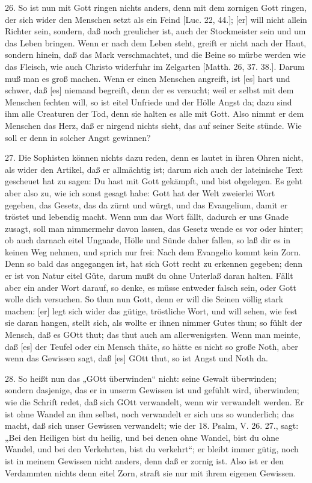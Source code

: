 26. So ist nun mit Gott ringen nichts anders, denn mit dem zornigen Gott ringen, der sich wider den Menschen setzt als ein Feind [Luc. 22, 44.]; [er] will nicht allein Richter sein, sondern, daß noch greulicher ist, auch der Stockmeister sein und um das Leben bringen. Wenn er nach dem Leben steht, greift er nicht nach der Haut, sondern hinein, daß das Mark verschmachtet, und die Beine so mürbe werden wie das Fleisch, wie auch Christo widerfuhr im Zelgarten [Matth. 26, 37. 38.]. Darum muß man es groß machen. Wenn er einen Menschen angreift, ist [es] hart und schwer, daß [es] niemand begreift, denn der es versucht; weil er selbst mit dem Menschen fechten will, so ist eitel Unfriede und der Hölle Angst da; dazu sind ihm alle Creaturen der Tod, denn sie halten es alle mit Gott. Also nimmt er dem Menschen das Herz, daß er nirgend nichts sieht, das auf seiner Seite stünde. Wie soll er denn in solcher Angst gewinnen?

27. Die Sophisten können nichts dazu reden, denn es lautet in ihren Ohren nicht, als wider den Artikel, daß er allmächtig ist; darum sich auch der lateinische Text gescheuet hat zu sagen: Du hast mit Gott gekämpft, und bist obgelegen. Es geht aber also zu, wie ich sonst gesagt habe: Gott hat der Welt zweierlei Wort gegeben, das Gesetz, das da zürnt und würgt, und das Evangelium, damit er tröstet und lebendig macht. Wenn nun das Wort fällt, dadurch er uns Gnade zusagt, soll man nimmermehr davon lassen, das Gesetz wende es vor oder hinter; ob auch darnach eitel Ungnade, Hölle und Sünde daher fallen, so laß dir es in keinen Weg nehmen, und sprich nur frei: Nach dem Evangelio kommt kein Zorn. Denn so bald das angegangen ist, hat sich Gott recht zu erkennen gegeben; denn er ist von Natur eitel Güte, darum mußt du ohne Unterlaß daran halten. Fällt aber ein ander Wort darauf, so denke, es müsse entweder falsch sein, oder Gott wolle dich versuchen. So thun nun Gott, denn er will die Seinen völlig stark machen: [er] legt sich wider das gütige, tröstliche Wort, und will sehen, wie fest sie daran hangen, stellt sich, als wollte er ihnen nimmer
Gutes thun; so fühlt der Mensch, daß es GOtt thut; das thut auch am allerwenigsten. Wenn man meinte, daß [es] der Teufel oder ein Mensch thäte, so hätte es nicht so große Noth, aber wenn das Gewissen sagt, daß [es] GOtt thut, so ist Angst und Noth da.

28. So heißt nun das „GOtt überwinden“ nicht: seine Gewalt überwinden; sondern dasjenige, das er in unserm Gewissen ist und gefühlt wird, überwinden; wie die Schrift redet, daß sich GOtt verwandelt, wenn wir verwandelt werden. Er ist ohne Wandel an ihm selbst, noch verwandelt er sich uns so wunderlich; das macht, daß sich unser Gewissen verwandelt; wie der 18. Psalm, V. 26. 27., sagt: „Bei den Heiligen bist du heilig, und bei denen ohne Wandel, bist du ohne Wandel, und bei den Verkehrten, bist du verkehrt“; er bleibt immer gütig, noch ist in meinem Gewissen nicht anders, denn daß er zornig ist. Also ist er den Verdammten nichts denn eitel Zorn, straft sie nur mit ihrem eigenen Gewissen.

